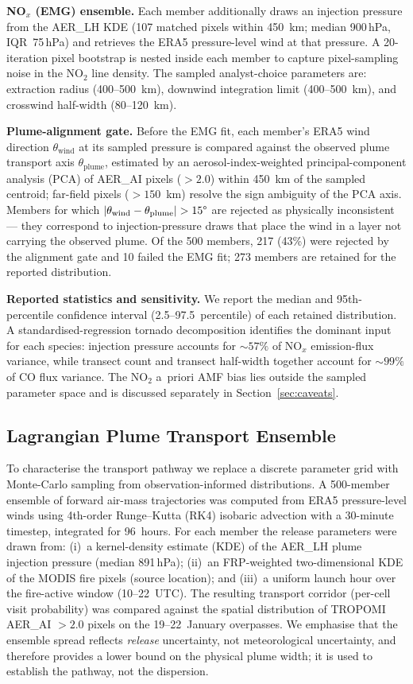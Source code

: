 \documentclass[draft]{agujournal2019}
\newcommand{\NOx}{NO$_x$}
\newcommand{\NOtwo}{NO$_2$}
\newcommand{\hPa}{\,hPa}
\begin{document}
\textbf{\NOx{} (EMG) ensemble.} Each member additionally draws an injection pressure from the AER\_LH KDE (107 matched pixels within 450~km; median 900\hPa, IQR~75\hPa) and retrieves the ERA5 pressure-level wind at that pressure. A 20-iteration pixel bootstrap is nested inside each member to capture pixel-sampling noise in the NO$_2$ line density. The sampled analyst-choice parameters are: extraction radius (400--500~km), downwind integration limit (400--500~km), and crosswind half-width (80--120~km).

\textbf{Plume-alignment gate.} Before the EMG fit, each member's ERA5 wind direction $\theta_\mathrm{wind}$ at its sampled pressure is compared against the observed plume transport axis $\theta_\mathrm{plume}$, estimated by an aerosol-index-weighted principal-component analysis (PCA) of AER\_AI pixels ($> 2.0$) within 450~km of the sampled centroid; far-field pixels ($>150$~km) resolve the sign ambiguity of the PCA axis. Members for which $|\theta_\mathrm{wind} - \theta_\mathrm{plume}| > 15\degree$ are rejected as physically inconsistent --- they correspond to injection-pressure draws that place the wind in a layer not carrying the observed plume. Of the 500 members, 217 (43\%) were rejected by the alignment gate and 10 failed the EMG fit; 273 members are retained for the reported distribution.

\textbf{Reported statistics and sensitivity.} We report the median and 95th-percentile confidence interval (2.5--97.5~percentile) of each retained distribution. A standardised-regression tornado decomposition identifies the dominant input for each species: injection pressure accounts for $\sim 57\%$ of \NOx{} emission-flux variance, while transect count and transect half-width together account for $\sim 99\%$ of CO flux variance. The \NOtwo{} a~priori AMF bias lies outside the sampled parameter space and is discussed separately in Section~\ref{sec:caveats}.

\subsection{Lagrangian Plume Transport Ensemble}
\label{sec:ensemble}

To characterise the transport pathway we replace a discrete parameter grid with Monte-Carlo sampling from observation-informed distributions. A 500-member ensemble of forward air-mass trajectories was computed from ERA5 pressure-level winds using 4th-order Runge--Kutta (RK4) isobaric advection with a 30-minute timestep, integrated for 96~hours. For each member the release parameters were drawn from: (i)~a kernel-density estimate (KDE) of the AER\_LH plume injection pressure (median 891\hPa); (ii)~an FRP-weighted two-dimensional KDE of the MODIS fire pixels (source location); and (iii)~a uniform launch hour over the fire-active window (10--22~UTC). The resulting transport corridor (per-cell visit probability) was compared against the spatial distribution of TROPOMI AER\_AI $> 2.0$ pixels on the 19--22~January overpasses. We emphasise that the ensemble spread reflects \emph{release} uncertainty, not meteorological uncertainty, and therefore provides a lower bound on the physical plume width; it is used to establish the pathway, not the dispersion.
\end{document}
